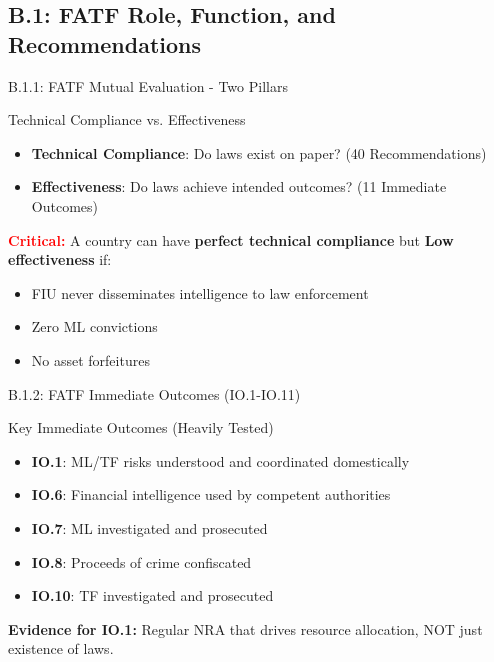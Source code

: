 \documentclass{beamer}
\begin{document}
	\subsection{B.1: FATF Role, Function, and Recommendations}
	
	\begin{frame}{B.1.1: FATF Mutual Evaluation - Two Pillars}
		\begin{block}{Technical Compliance vs. Effectiveness}
			\begin{itemize}
				\item \textbf{Technical Compliance}: Do laws exist on paper? (40 Recommendations)
				\item \textbf{Effectiveness}: Do laws achieve intended outcomes? (11 Immediate Outcomes)
			\end{itemize}
		\end{block}
		\textcolor{red}{\textbf{ Critical:}} A country can have \textbf{perfect technical compliance} but \textbf{Low effectiveness} if:
		\begin{itemize}
			\item FIU never disseminates intelligence to law enforcement
			\item Zero ML convictions
			\item No asset forfeitures
		\end{itemize}
	\end{frame}
	
	\begin{frame}{B.1.2: FATF Immediate Outcomes (IO.1-IO.11)}
		\begin{block}{Key Immediate Outcomes (Heavily Tested)}
			\begin{itemize}
				\item \textbf{IO.1}: ML/TF risks understood and coordinated domestically
				\item \textbf{IO.6}: Financial intelligence used by competent authorities
				\item \textbf{IO.7}: ML investigated and prosecuted
				\item \textbf{IO.8}: Proceeds of crime confiscated
				\item \textbf{IO.10}: TF investigated and prosecuted
			\end{itemize}
		\end{block}
		\textbf{Evidence for IO.1:} Regular NRA that drives resource allocation, NOT just existence of laws.
	\end{frame}
	
\end{document}
